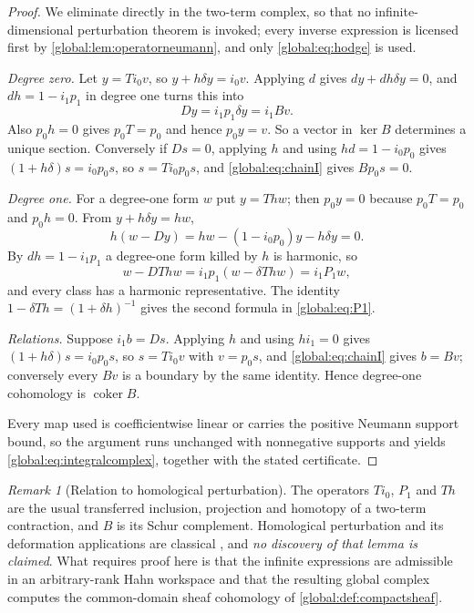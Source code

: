 \documentclass[11pt,letterpaper]{article}
\theoremstyle{definition}
\theoremstyle{remark}
\newtheorem{remark}[remark]{Remark}
\newcommand{\coker}{\operatorname{coker}}
\numberwithin{equation}{section}
\begin{document}
\begin{proof}
We eliminate directly in the two-term complex, so that no infinite-dimensional perturbation theorem is invoked; every inverse expression is licensed first by \cref{global:lem:operatorneumann}, and only \eqref{global:eq:hodge} is used.

\emph{Degree zero.} Let $y=Ti_0v$, so $y+h\delta y=i_0v$. Applying $d$ gives $dy+dh\delta y=0$, and $dh=1-i_1p_1$ in degree one turns this into
\begin{equation}\label{global:eq:chainI}
  Dy=i_1p_1\delta y=i_1Bv .
\end{equation}
Also $p_0h=0$ gives $p_0T=p_0$ and hence $p_0y=v$. So a vector in $\ker B$ determines a unique section. Conversely if $Ds=0$, applying $h$ and using $hd=1-i_0p_0$ gives $(1+h\delta)s=i_0p_0s$, so $s=Ti_0p_0s$, and \eqref{global:eq:chainI} gives $Bp_0s=0$.

\emph{Degree one.} For a degree-one form $w$ put $y=Thw$; then $p_0y=0$ because $p_0T=p_0$ and $p_0h=0$. From $y+h\delta y=hw$,
\[
  h(w-Dy)=hw-(1-i_0p_0)y-h\delta y=0 .
\]
By $dh=1-i_1p_1$ a degree-one form killed by $h$ is harmonic, so
\begin{equation}\label{global:eq:eliminate}
  w-DThw=i_1p_1(w-\delta Thw)=i_1P_1w,
\end{equation}
and every class has a harmonic representative. The identity $1-\delta Th=(1+\delta h)^{-1}$ gives the second formula in \eqref{global:eq:P1}.

\emph{Relations.} Suppose $i_1b=Ds$. Applying $h$ and using $hi_1=0$ gives $(1+h\delta)s=i_0p_0s$, so $s=Ti_0v$ with $v=p_0s$, and \eqref{global:eq:chainI} gives $b=Bv$; conversely every $Bv$ is a boundary by the same identity. Hence degree-one cohomology is $\coker B$.

Every map used is coefficientwise linear or carries the positive Neumann support bound, so the argument runs unchanged with nonnegative supports and yields \eqref{global:eq:integralcomplex}, together with the stated certificate.
\end{proof}

\begin{remark}[Relation to homological perturbation]\label{global:rem:perturbation}
The operators $Ti_0$, $P_1$ and $Th$ are the usual transferred inclusion, projection and homotopy of a two-term contraction, and $B$ is its Schur complement. Homological perturbation and its deformation applications are classical \cite{Crainic,GL}, and \emph{no discovery of that lemma is claimed}. What requires proof here is that the infinite expressions are admissible in an arbitrary-rank Hahn workspace and that the resulting global complex computes the common-domain sheaf cohomology of \cref{global:def:compactsheaf}.
\end{remark}
\end{document}
